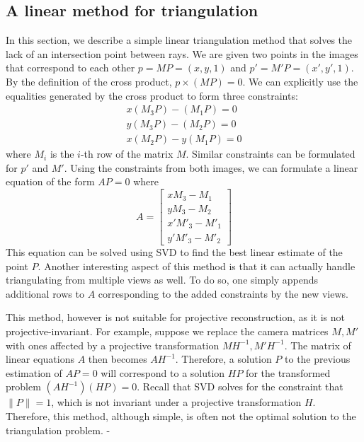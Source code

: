 \documentclass[a4paper, 12pt]{article}
\numberwithin{equation}{section}
\begin{document}
\subsection{A linear method for triangulation}
In this section, we describe a simple linear triangulation method that solves the lack of an intersection point between rays. We are given two points in the images that correspond to each other $p = MP = (x,y,1)$ and $p'=M'P = (x', y', 1)$. By the definition of the cross product, $p\times(MP) = 0$. We can explicitly use the equalities generated by the cross product to form three constraints:
\begin{equation}
    \begin{split}
        x(M_3P) - (M_1P) = 0\\
        y(M_3P) - (M_2P) = 0\\
        x(M_2P) - y(M_1P) = 0
    \end{split}
\end{equation}
where $M_i$ is the $i$-th row of the matrix $M$. Similar constraints can be formulated for $p'$ and $M'$. Using the constraints from both images, we can formulate a linear equation of the form $AP = 0$ where
\begin{equation}
    A = \begin{bmatrix}
        xM_3 - M_1 \\ 
        y M_3 - M_2 \\
        x'M'_3 - M'_1 \\
        y'M'_3 - M'_2
    \end{bmatrix}
\end{equation}
This equation can be solved using SVD to find the best linear estimate of the point $P$. Another interesting aspect of this method is that it can actually handle triangulating from multiple views as well. To do so, one simply appends additional rows to $A$ corresponding to the added constraints by the new views.

This method, however is not suitable for projective reconstruction, as it is not projective-invariant. For example, suppose we replace the camera matrices $M, M'$ with ones affected by a projective transformation $MH^{-1}, M'H^{-1}$. The matrix of linear equations $A$ then becomes $AH^{-1}$. Therefore, a solution $P$ to the previous estimation of $AP=0$ will correspond to a solution $HP$ for the transformed problem $(AH^{-1})(HP) = 0$. Recall that SVD solves for the constraint that $\|P\| = 1$, which is not invariant under a projective transformation $H$. Therefore, this method, although simple, is often not the optimal solution to the triangulation problem. 
-
\end{document}
